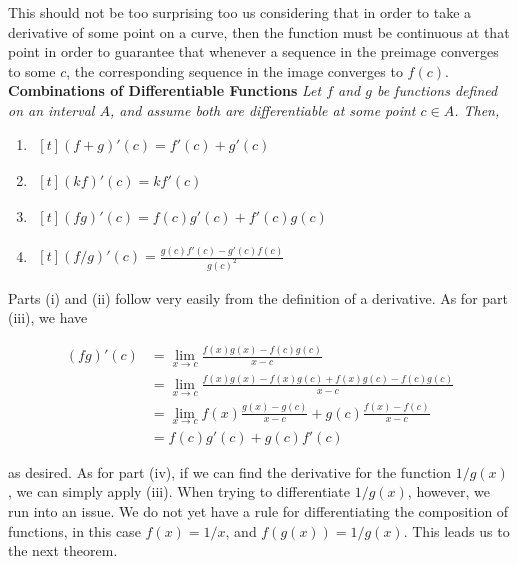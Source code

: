 \documentclass[12pt, letterpaper, twoside]{article}
\begin{document}
This should not be too surprising too us considering that in order to take a derivative of some point on a curve, then the function must be continuous at that point in order to guarantee that whenever a sequence in the preimage converges to some $c$, the corresponding sequence in the image converges to $f(c)$. \\

\textbf{ Combinations of Differentiable Functions } \textit{Let $f$ and $g$ be functions defined on an interval $A$, and assume
both are differentiable at some point $c \in A$. Then,}
\begin{enumerate}[label=(\roman*)]
\itemsep -0.2em
\item $\begin{aligned}[t]
    (f + g)'(c) = f'(c) + g'(c)
\end{aligned}$
\item $\begin{aligned}[t]
    (kf)'(c) = kf'(c)
\end{aligned}$
\item $\begin{aligned}[t]
   (fg)'(c) = f(c)g'(c) + f'(c)g(c)
\end{aligned}$
\item $\begin{aligned}[t]
   (f/g)'(c) = \frac{g(c)f'(c) - g'(c)f(c)}{g(c)^2}
\end{aligned}$
\end{enumerate}

Parts (i) and (ii) follow very easily from the definition of a derivative. As for part (iii), we have

\begin{align*}
    (fg)'(c) &= \lim_{x \to c} \frac{f(x)g(x) - f(c)g(c)}{x-c} \\
    &= \lim_{x \to c} \frac{f(x)g(x) - f(x)g(c) + f(x)g(c) - f(c)g(c)}{x-c} \\
    &= \lim_{x \to c} f(x)\frac{g(x)-g(c)}{x-c} + g(c)\frac{f(x)-f(c)}{x-c} \\
    &= f(c)g'(c) + g(c) f'(c)
\end{align*}

as desired. As for part (iv), if we can find the derivative for the function $1/g(x)$, we can simply apply (iii). When trying to differentiate $1/g(x)$, however, we run into an issue. We do not yet have a rule for differentiating the composition of functions, in this case $f(x) = 1/x$, and $f(g(x)) = 1/g(x)$. This leads us to the next theorem. \\
\end{document}
